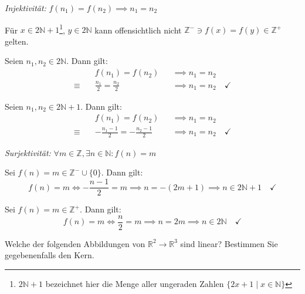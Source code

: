 \documentclass[answers]{exam}
\newcommand{\vektor}[1]{\begin{pmatrix*}[c] #1 \end{pmatrix*}}
\newcommand{\N}{\mathbb{N}}
\newcommand{\Z}{\mathbb{Z}}
\newcommand{\R}{\mathbb{R}}
\begin{document}
\begin{questions}
\begin{parts}
\begin{solution}
            \emph{Injektivität:} $f(n_1) = f(n_2) \implies n_1 = n_2$

            Für $x \in 2\N + 1$\footnote{$2\N + 1$ bezeichnet hier die Menge aller ungeraden Zahlen $\{2x + 1 \mid x \in \N\}$}, $y \in 2\N$ kann offensichtlich nicht $\Z^- \ni f(x) = f(y) \in \Z^+$ gelten.

            Seien $n_1, n_2 \in 2\N$. Dann gilt:
            $$
                \begin{aligned}
                                 & f(n_1) = f(n_2)               &  & \implies n_1 = n_2                  \\
                    \equiv \quad & \frac{n_1}{2} = \frac{n_2}{2} &  & \implies n_1 = n_2 \quad \checkmark
                \end{aligned}
            $$

            Seien $n_1, n_2 \in 2\N + 1$. Dann gilt:
            $$
                \begin{aligned}
                                 & f(n_1) = f(n_2)                     &  & \implies n_1 = n_2                  \\
                    \equiv \quad & -\frac{n_1-1}{2} = -\frac{n_2-1}{2} &  & \implies n_1 = n_2 \quad \checkmark
                \end{aligned}
            $$

            \emph{Surjektivität:} $\forall m \in \Z, \exists n \in \N : f(n) = m$

            Sei $f(n) = m \in \Z^- \cup \{0\}$. Dann gilt:
            $$
                f(n) = m \iff  -\frac{n-1}{2} = m \implies n = -(2m+1) \implies n \in 2\N + 1 \quad \checkmark
            $$

            Sei $f(n) = m \in \Z^+$. Dann gilt:
            $$
                f(n) = m \iff   \frac{n}{2} = m \implies n = 2m \implies n \in 2\N \quad \checkmark
            $$


        \end{solution}
    \end{parts}

    \newpage
    \question
    Welche der folgenden Abbildungen von $\R^2 \to \R^3$ sind linear?
    Bestimmen Sie gegebenenfalls den Kern.
\end{questions}
\end{document}
